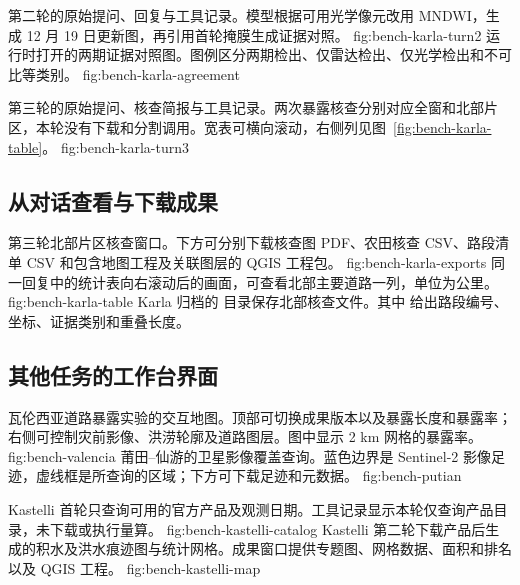 \clearpage
{}
  {第二轮的原始提问、回复与工具记录。模型根据可用光学像元改用 MNDWI，生成 12 月 19 日更新图，再引用首轮掩膜生成证据对照。}
  {fig:bench-karla-turn2}
  {运行时打开的两期证据对照图。图例区分两期检出、仅雷达检出、仅光学检出和不可比等类别。}
  {fig:bench-karla-agreement}

\clearpage
{}
  {第三轮的原始提问、核查简报与工具记录。两次暴露核查分别对应全窗和北部片区，本轮没有下载和分割调用。宽表可横向滚动，右侧列见图~\ref{fig:bench-karla-table}。}
  {fig:bench-karla-turn3}

\clearpage
\subsection{从对话查看与下载成果}
  {第三轮北部片区核查窗口。下方可分别下载核查图 PDF、农田核查 CSV、路段清单 CSV 和包含地图工程及关联图层的 QGIS 工程包。}
  {fig:bench-karla-exports}
  {同一回复中的统计表向右滚动后的画面，可查看北部主要道路一列，单位为公里。}
  {fig:bench-karla-table}
Karla 归档的  目录保存北部核查文件。其中  给出路段编号、坐标、证据类别和重叠长度。

\clearpage
\subsection{其他任务的工作台界面}
  {瓦伦西亚道路暴露实验的交互地图。顶部可切换成果版本以及暴露长度和暴露率；右侧可控制灾前影像、洪涝轮廓及道路图层。图中显示 2 km 网格的暴露率。}
  {fig:bench-valencia}
  {莆田--仙游的卫星影像覆盖查询。蓝色边界是 Sentinel-2 影像足迹，虚线框是所查询的区域；下方可下载足迹和元数据。}
  {fig:bench-putian}

\clearpage
{}
  {Kastelli 首轮只查询可用的官方产品及观测日期。工具记录显示本轮仅查询产品目录，未下载或执行量算。}
  {fig:bench-kastelli-catalog}
  {Kastelli 第二轮下载产品后生成的积水及洪水痕迹图与统计网格。成果窗口提供专题图、网格数据、面积和排名以及 QGIS 工程。}
  {fig:bench-kastelli-map}

\endgroup
{}

